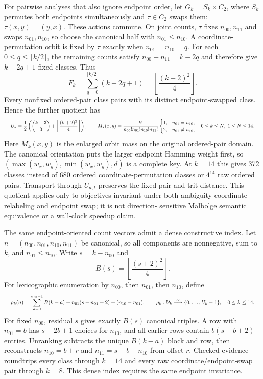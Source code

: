 \documentclass{article}
\newcommand{\fitmath}[1]{\resizebox{0.99\linewidth}{!}{$\displaystyle #1$}}
\begin{document}
For pairwise analyses that also ignore endpoint order, let
$G_k=S_k\times C_2$, where $S_k$ permutes both endpoints simultaneously and
$\tau\in C_2$ swaps them: $\tau(x,y)=(y,x)$. These actions commute. On joint
counts, $\tau$ fixes $n_{00},n_{11}$ and swaps $n_{01},n_{10}$, so choose the
canonical half with $n_{01}\leq n_{10}$. A coordinate-permutation orbit is
fixed by $\tau$ exactly when $n_{01}=n_{10}=q$. For each
$0\leq q\leq\lfloor k/2\rfloor$, the remaining counts satisfy
$n_{00}+n_{11}=k-2q$ and therefore give $k-2q+1$ fixed classes. Thus
\[
  F_k=\sum_{q=0}^{\lfloor k/2\rfloor}(k-2q+1)
    =\left\lfloor\frac{(k+2)^2}{4}\right\rfloor.
\]
Every nonfixed ordered-pair class pairs with its distinct endpoint-swapped
class. Hence the further quotient has
\begin{equation}
  \fitmath{%
    U_k=\frac{1}{2}\left(
      \binom{k+3}{3}+\left\lfloor\frac{(k+2)^2}{4}\right\rfloor
    \right),
    \qquad M_k(x,y)=
    \frac{k!}{n_{00}!n_{01}!n_{10}!n_{11}!}
    \begin{cases}
      1,&n_{01}=n_{10},\\
      2,&n_{01}\neq n_{10},
    \end{cases}
    \quad 0\leq k\leq N,\ 1\leq N\leq14.
  }
  \label{eq:optimization-crazy-preimage-cube-endpoint-symmetric-pair-quotient}
\end{equation}
Here $M_k(x,y)$ is the enlarged orbit mass on the original ordered-pair domain.
The canonical orientation puts the larger endpoint Hamming weight first, so
$(\max(w_x,w_y),\min(w_x,w_y),d)$ is a complete key. At $k=14$ this gives
372 classes instead of 680 ordered coordinate-permutation classes or $4^{14}$
raw ordered pairs. Transport through $U_{a,t}$ preserves the fixed pair and
trit distance. This quotient applies only to objectives invariant under both
ambiguity-coordinate relabeling and endpoint swap; it is not direction-
sensitive Malbolge semantic equivalence or a wall-clock speedup claim.

The same endpoint-oriented count vectors admit a dense constructive index. Let
$n=(n_{00},n_{01},n_{10},n_{11})$ be canonical, so all components are
nonnegative, sum to $k$, and $n_{01}\leq n_{10}$. Write
$s=k-n_{00}$ and
\[
  B(s)=\left\lfloor\frac{(s+2)^2}{4}\right\rfloor.
\]
For lexicographic enumeration by $n_{00}$, then $n_{01}$, then $n_{10}$,
define
\begin{equation}
  \fitmath{%
    \rho_k(n)=
      \sum_{a=0}^{n_{00}-1}B(k-a)
      +n_{01}(s-n_{01}+2)
      +(n_{10}-n_{01}),
    \qquad
    \rho_k:\mathcal U_k\overset{\sim}{\longrightarrow}\{0,\ldots,U_k-1\},
    \quad 0\leq k\leq14.
  }
  \label{eq:optimization-crazy-preimage-cube-endpoint-symmetric-pair-ranking}
\end{equation}
For fixed $n_{00}$, residual $s$ gives exactly $B(s)$ canonical triples.
A row with $n_{01}=b$ has $s-2b+1$ choices for $n_{10}$, and all earlier rows
contain $b(s-b+2)$ entries. Unranking subtracts the unique $B(k-a)$ block and
row, then reconstructs
$n_{10}=b+r$ and $n_{11}=s-b-n_{10}$ from offset $r$. Checked evidence
roundtrips every class through $k=14$ and every raw coordinate/endpoint-swap
pair through $k=8$. This dense index requires the same endpoint invariance.
\end{document}
